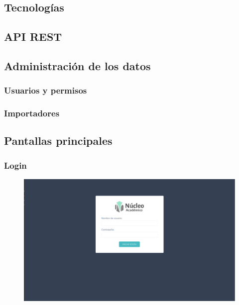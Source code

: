 \subsection{Tecnologías}

\subsection{API REST}

\subsection{Administración de los datos}

\subsubsection{Usuarios y permisos}

\subsubsection{Importadores}

\subsection{Pantallas principales}

\subsubsection{Login}
\begin{figure}[h!]
  \centering
    \includegraphics[scale=0.3]{images/nucleo/nucleo-login.png}
  \label{fig:django}
\end{figure}

